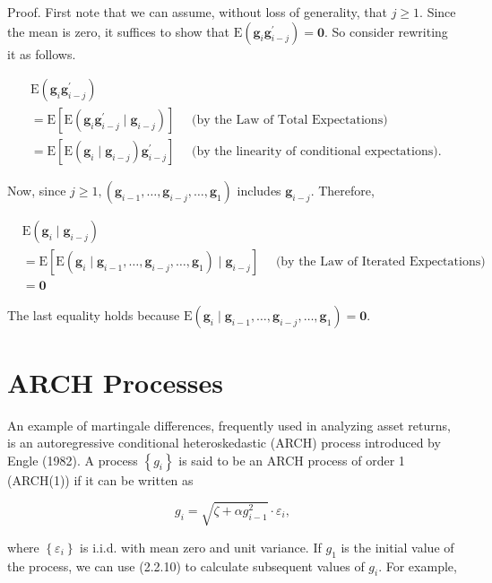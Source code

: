 \documentclass[10pt]{article}
\begin{document}
Proof. First note that we can assume, without loss of generality, that $j \geq 1$. Since the mean is zero, it suffices to show that $\mathrm{E}\left(\mathbf{g}_{i} \mathbf{g}_{i-j}^{\prime}\right)=\mathbf{0}$. So consider rewriting it as follows.

$$
\begin{aligned}
& \mathrm{E}\left(\mathbf{g}_{i} \mathbf{g}_{i-j}^{\prime}\right) \\
& =\mathrm{E}\left[\mathrm{E}\left(\mathbf{g}_{i} \mathbf{g}_{i-j}^{\prime} \mid \mathbf{g}_{i-j}\right)\right] \quad \text { (by the Law of Total Expectations) } \\
& =\mathrm{E}\left[\mathrm{E}\left(\mathbf{g}_{i} \mid \mathbf{g}_{i-j}\right) \mathbf{g}_{i-j}^{\prime}\right] \quad \text { (by the linearity of conditional expectations). }
\end{aligned}
$$

Now, since $j \geq 1,\left(\mathbf{g}_{i-1}, \ldots, \mathbf{g}_{i-j}, \ldots, \mathbf{g}_{1}\right)$ includes $\mathbf{g}_{i-j}$. Therefore,

$$
\begin{aligned}
& \mathrm{E}\left(\mathbf{g}_{i} \mid \mathbf{g}_{i-j}\right) \\
& =\mathrm{E}\left[\mathrm{E}\left(\mathbf{g}_{i} \mid \mathbf{g}_{i-1}, \ldots, \mathbf{g}_{i-j}, \ldots, \mathbf{g}_{1}\right) \mid \mathbf{g}_{i-j}\right] \quad \text { (by the Law of Iterated Expectations) } \\
& =\mathbf{0}
\end{aligned}
$$

The last equality holds because $\mathrm{E}\left(\mathbf{g}_{i} \mid \mathbf{g}_{i-1}, \ldots, \mathbf{g}_{i-j}, \ldots, \mathbf{g}_{1}\right)=\mathbf{0}$.

\section*{ARCH Processes}
An example of martingale differences, frequently used in analyzing asset returns, is an autoregressive conditional heteroskedastic (ARCH) process introduced by Engle (1982). A process $\left\{g_{i}\right\}$ is said to be an ARCH process of order 1 (ARCH(1)) if it can be written as


\begin{equation*}
g_{i}=\sqrt{\zeta+\alpha g_{i-1}^{2}} \cdot \varepsilon_{i}, \tag{2.2.10}
\end{equation*}


where $\left\{\varepsilon_{i}\right\}$ is i.i.d. with mean zero and unit variance. If $g_{1}$ is the initial value of the process, we can use (2.2.10) to calculate subsequent values of $g_{i}$. For example,
\end{document}
